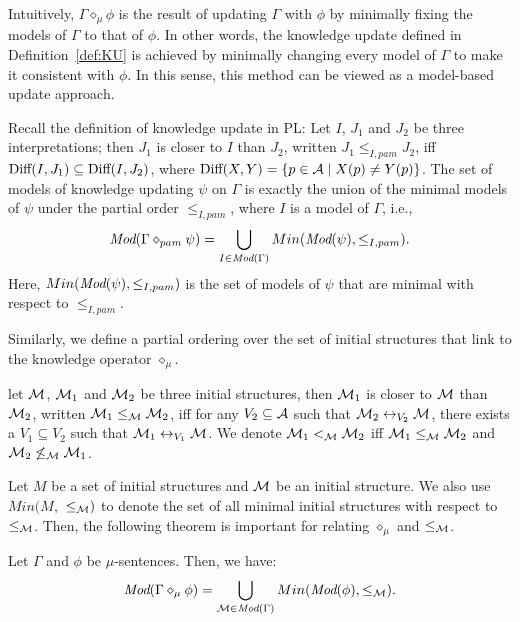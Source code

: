 \documentclass[runningheads]{llncs}
\begin{document}
Intuitively, $\Gamma \diamond_{\mu} \phi$ is the result of updating $\Gamma$ with $\phi$ by minimally fixing the models of $\Gamma$ to that of $\phi$.
In other words, the knowledge update defined in Definition~\ref{def:KU} is achieved by minimally changing every model of $\Gamma$ to make it consistent with $\phi$. In this sense, this method can be viewed as a model-based update approach.

Recall the definition of knowledge update in PL:
Let $I$, $J_1$ and $J_2$ be three interpretations; then $J_1$ is closer to $I$ than $J_2$, written $J_1 \leq_{I,pam} J_2$, iff $\textrm{Diff}(I, J_1) \subseteq \textrm{Diff}(I, J_2)$, where $\textrm{Diff}(X, Y) =\{p\in {\cal A} \mid X(p) \not = Y(p)\}$.
The set of models of knowledge updating $\psi$ on $\Gamma$ is exactly the union of the minimal models of $\psi$ under the partial order $\leq_{I,pam}$, where $I$ is a model of $\Gamma$, i.e., $$\textit{Mod}(\Gamma \diamond_{pam} \psi) = \bigcup_{I \in \textit{Mod}(\Gamma)} Min(\textit{Mod}(\psi), \leq_{I,pam}).$$ Here, $Min(\textit{Mod}(\psi), \leq_{I,pam})$ is the set of models of $\psi$ that are minimal with respect to $\leq_{I,pam}$.


Similarly, we define a partial ordering over the set of initial structures that link to the knowledge operator $\diamond_{\mu}$.

\begin{definition}\label{def:closer}
  let ${\cal M}$, ${\cal M}_1$ and ${\cal M}_2$ be three initial structures, then ${\cal M}_1$ is closer to ${\cal M}$ than ${\cal M}_2$, written ${\cal M}_1 \leq_{{\cal M}} {\cal M}_2$, iff for any $V_2 \subseteq \mathcal{A}$ such that ${\cal M}_2 \leftrightarrow_{V_2} {\cal M}$, there exists a $V_1 \subseteq V_2$ such that ${\cal M}_1 \leftrightarrow_{V_1} {\cal M}$. We denote ${\cal M}_1 <_{{\cal M}} {\cal M}_2$ iff ${\cal M}_1 \leq_{{\cal M}} {\cal M}_2$ and ${\cal M}_2 \not \leq_{{\cal M}} {\cal M}_1$.
\end{definition}


Let $M$ be a set of initial structures and ${\cal M}$ be an initial structure. We also use $Min(M,$ $\leq_{{\cal M}})$ to denote the set of all minimal initial structures with respect to $\leq_{{\cal M}}$.
Then, the following theorem is important for relating $\diamond_{\mu}$ and $\leq_{{\cal M}}$.


\begin{theorem}\label{thm:minU}
Let $\Gamma$ and $\phi$ be $\mu$-sentences. Then, we have:
\[\textit{Mod}(\Gamma \diamond_{\mu} \phi) = \bigcup_{{\cal M}\in \textit{Mod}(\Gamma)} Min(\textit{Mod}(\phi), \leq_{{\cal M}}).
\]
\end{theorem}
\end{document}
